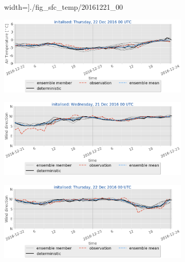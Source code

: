 \begin{figure}[H]
\begin{subfigure}[b]{0.49\textwidth}
		width=\textwidth]{./fig_sfc_temp/20161221_00}
		\caption{}\label{fig:res:sfc_temp21}
	\end{subfigure}
	\begin{subfigure}[b]{0.49\textwidth}
		\includegraphics[trim={0.cm 5.cm 0cm 0cm},clip,
		width=\textwidth]{./fig_sfc_temp/20161222_00}
		\caption{}\label{fig:res:sfc_temp22}
	\end{subfigure}
	\begin{subfigure}[b]{0.49\textwidth}
		\includegraphics[trim={0.cm 5.cm 0cm 0cm},clip,
		width=\textwidth]{./fig_sfc_wd/20161221_00}
		\caption{}\label{fig:res:sfc_wd21}
	\end{subfigure}
	\begin{subfigure}[b]{0.49\textwidth}
		\includegraphics[trim={0.cm 5.cm 0cm 0cm},clip,
		width=\textwidth]{./fig_sfc_wd/20161222_00}
		\caption{}\label{fig:res:sfc_wd22}
	\end{subfigure}

\end{figure}
